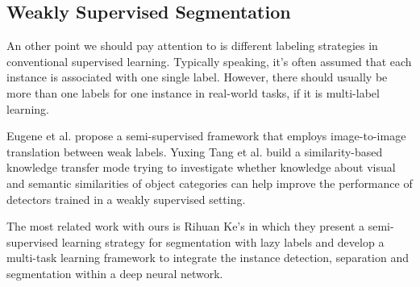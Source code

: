 \documentclass[10pt,twocolumn,letterpaper]{article}
\begin{document}
\subsection{Weakly Supervised Segmentation}
An other point we should pay attention to is different labeling strategies in conventional supervised learning.
Typically speaking, it's often assumed that each instance is associated with one single label. However, there should usually be more than one labels for one instance in real-world tasks, if it is multi-label learning.



Eugene et al. propose a semi-supervised framework that employs image-to-image translation between weak labels.
Yuxing Tang et al. build a similarity-based knowledge transfer mode trying to investigate whether knowledge about visual and semantic similarities of object categories can help improve the performance of detectors trained in a weakly supervised setting.

The most related work with ours is Rihuan Ke's\cite{ke2019multi} in which they present a semi-supervised learning strategy for segmentation with lazy labels and develop a multi-task learning framework to integrate the instance detection, separation and segmentation within a deep neural network.
\end{document}
